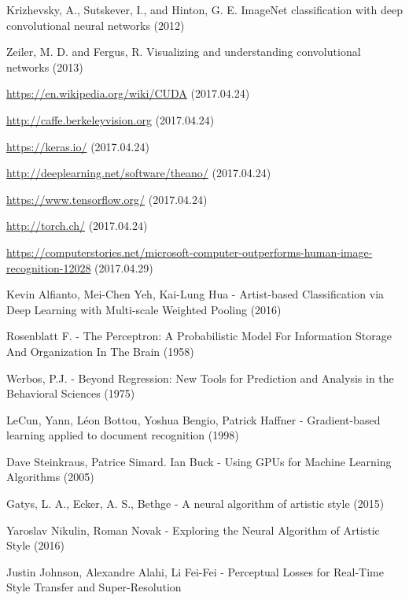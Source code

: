 \documentclass[12pt, a4paper, oneside]{book}
\theoremstyle{tetel}
\begin{document}
\newpage
 \listoffigures


\newpage
\begin{thebibliography}{1}

Krizhevsky, A., Sutskever, I., and Hinton, G. E. ImageNet classification with deep convolutional neural networks (2012)

Zeiler, M. D. and Fergus, R. Visualizing and understanding convolutional networks (2013)

\url {https://en.wikipedia.org/wiki/CUDA} (2017.04.24)

\url {http://caffe.berkeleyvision.org} (2017.04.24)

\url {https://keras.io/} (2017.04.24)

\url {http://deeplearning.net/software/theano/} (2017.04.24)

\url {https://www.tensorflow.org/} (2017.04.24)

\url {http://torch.ch/} (2017.04.24)

\url {https://computerstories.net/microsoft-computer-outperforms-human-image-recognition-12028} (2017.04.29)

Kevin Alfianto, Mei-Chen Yeh, Kai-Lung Hua - Artist-based Classification via Deep Learning with Multi-scale Weighted Pooling (2016)

Rosenblatt F. - The Perceptron: A Probabilistic Model For Information Storage And Organization In The Brain (1958)

Werbos, P.J. - Beyond Regression: New Tools for Prediction and Analysis in the Behavioral Sciences (1975)
 
LeCun, Yann, Léon Bottou, Yoshua Bengio, Patrick Haffner - Gradient-based learning applied to document recognition (1998)

Dave Steinkraus, Patrice Simard. Ian Buck - Using GPUs for Machine Learning Algorithms (2005)

Gatys, L. A., Ecker, A. S., Bethge - A neural algorithm of artistic style (2015)

Yaroslav Nikulin, Roman Novak - Exploring the Neural Algorithm of Artistic Style (2016)

Justin Johnson, Alexandre Alahi, Li Fei-Fei - Perceptual Losses for Real-Time Style Transfer and Super-Resolution


\end{thebibliography}
\end{document}
